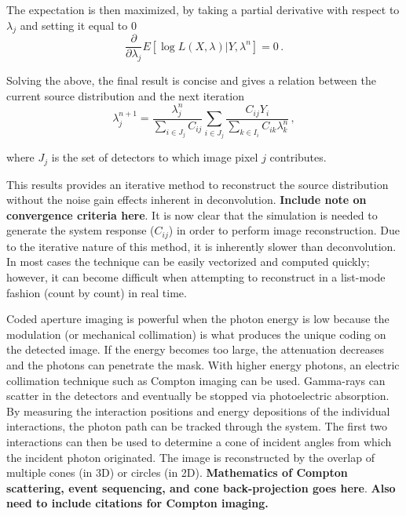\documentclass[10pt]{article}
\begin{document}
\noindent The expectation is then maximized, by taking a partial derivative with respect to $\lambda_j$ and setting it equal to 0
 \begin{equation}
	\frac{\partial}{\partial \lambda_j} E[\log L(X,\lambda) | Y,\lambda^n] = 0\,.
\end{equation}

\noindent Solving the above, the final result is concise and gives a relation between the current source distribution and the next iteration
%
 \begin{equation}
	\lambda_j^{n+1} = \frac{\lambda_j^n}{\sum\limits_{i \in J_j}C_{ij}} \sum_{i \in J_j} \frac{C_{ij}Y_i}{\sum\limits_{k \in I_i}C_{ik}\lambda_k^n}\,,
\end{equation}

\noindent where $J_j$ is the set of detectors to which image pixel $j$ contributes.

This results provides an iterative method to reconstruct the source distribution without the noise gain effects inherent in deconvolution. \textbf{Include note on convergence criteria here}. It is now clear that the simulation is needed to generate the system response ($C_{ij}$) in order to perform image reconstruction. Due to the iterative nature of this method, it is inherently slower than deconvolution. In most cases the technique can be easily vectorized and computed quickly; however, it can become difficult when attempting to reconstruct in a list-mode fashion (count by count) in real time.

Coded aperture imaging is powerful when the photon energy is low because the modulation (or mechanical collimation) is what produces the unique coding on the detected image. If the energy becomes too large, the attenuation decreases and the photons can penetrate the mask. With higher energy photons, an electric collimation technique such as Compton imaging can be used. Gamma-rays can scatter in the detectors and eventually be stopped via photoelectric absorption. By measuring the interaction positions and energy depositions of the individual interactions, the photon path can be tracked through the system. The first two interactions can then be used to determine a cone of incident angles from which the incident photon originated. The image is reconstructed by the overlap of multiple cones (in 3D) or circles (in 2D). \textbf{Mathematics of Compton scattering, event sequencing, and cone back-projection goes here}. \textbf{Also need to include citations for Compton imaging.}
\end{document}
